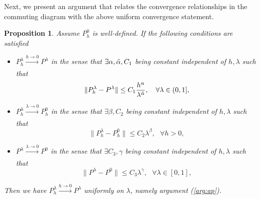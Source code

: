 \documentclass{report}
\newtheorem{proposition}{Proposition}
\begin{document}
Next, we present an argument that relates the convergence relationships in the commuting diagram with the above uniform convergence statement.
\begin{proposition} \label{prop:1}
Assume $P^0_h$ is well-defined. If the following conditions are satisfied
\begin{itemize}
    \item[$(*)$] $P^\lambda_h \xrightarrow[]{h\rightarrow0}P^\lambda$ in the sense that $\exists \alpha, \Tilde{\alpha}, C_1$ being constant independent of $h, \lambda$ such that
    \begin{equation*}
        \|P^\lambda_h - P^\lambda\| \leq C_1\frac{h^\alpha}{\lambda^{\Tilde{\alpha}}},\ \ \ \forall \lambda \in (0,1],
    \end{equation*}
    \item[$(**)$] $P^\lambda_h \xrightarrow[]{\lambda\rightarrow0} P^0_h$ in the sense that $\exists \beta, C_2$ being constant independent of $h, \lambda$ such that
    \begin{equation*}
        \|P^\lambda_h - P^0_h\| \leq C_2\lambda^\beta,\ \ \ \forall h > 0,
    \end{equation*}
    \item[$(\$)$] $P^\lambda \xrightarrow[]{\lambda\rightarrow0}P^0$ in the sense that $\exists C_3, \gamma$ being constant independent of $h, \lambda$ such that
    \begin{equation*}
        \| P^\lambda - P^0\| \leq C_3\lambda^\gamma, \ \ \ \forall \lambda \in [0,1],
    \end{equation*}
\end{itemize}
Then we have $P^\lambda_h \xrightarrow[]{h\rightarrow0} P^\lambda$ uniformly on $\lambda$, namely argument (\ref{arg:ap}).
\end{proposition}
\end{document}
